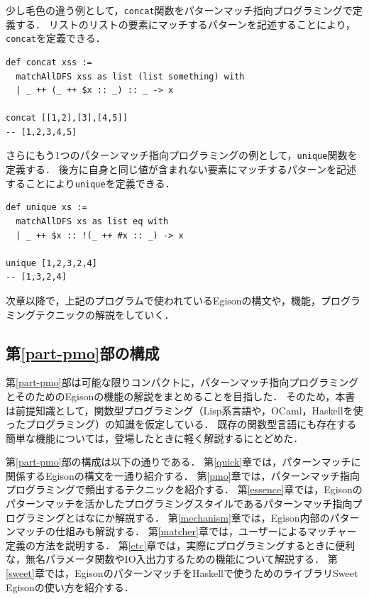 少し毛色の違う例として，\lstinline{concat}関数をパターンマッチ指向プログラミングで定義する．
リストのリストの要素にマッチするパターンを記述することにより，\lstinline{concat}を定義できる．

\begin{lstlisting}[language=egison,numbers=none]
def concat xss :=
  matchAllDFS xss as list (list something) with
  | _ ++ (_ ++ $x :: _) :: _ -> x

concat [[1,2],[3],[4,5]]
-- [1,2,3,4,5]
\end{lstlisting}

さらにもう1つのパターンマッチ指向プログラミングの例として，\lstinline{unique}関数を定義する．
後方に自身と同じ値が含まれない要素にマッチするパターンを記述することにより\lstinline{unique}を定義できる．
\begin{lstlisting}[language=egison,numbers=none]
def unique xs :=
  matchAllDFS xs as list eq with
  | _ ++ $x :: !(_ ++ #x :: _) -> x

unique [1,2,3,2,4]
-- [1,3,2,4]  
\end{lstlisting}
次章以降で，上記のプログラムで使われているEgisonの構文や，機能，プログラミングテクニックの解説をしていく．

\subsection{第\ref{part-pmo}部の構成}

第\ref{part-pmo}部は可能な限りコンパクトに，パターンマッチ指向プログラミングとそのためのEgisonの機能の解説をまとめることを目指した．
そのため，本書は前提知識として，関数型プログラミング（Lisp系言語や，OCaml，Haskellを使ったプログラミング）の知識を仮定している．
既存の関数型言語にも存在する簡単な機能については，登場したときに軽く解説するにとどめた．

第\ref{part-pmo}部の構成は以下の通りである．
第\ref{quick}章では，パターンマッチに関係するEgisonの構文を一通り紹介する．
第\ref{pmo}章では，パターンマッチ指向プログラミングで頻出するテクニックを紹介する．
第\ref{essence}章では，Egisonのパターンマッチを活かしたプログラミングスタイルであるパターンマッチ指向プログラミングとはなにか解説する．
第\ref{mechanism}章では，Egison内部のパターンマッチの仕組みも解説する．
第\ref{matcher}章では，ユーザーによるマッチャー定義の方法を説明する．
第\ref{etc}章では，実際にプログラミングするときに便利な，無名パラメータ関数やIO入出力するための機能について解説する．
第\ref{sweet}章では，EgisonのパターンマッチをHaskellで使うためのライブラリSweet Egisonの使い方を紹介する．

